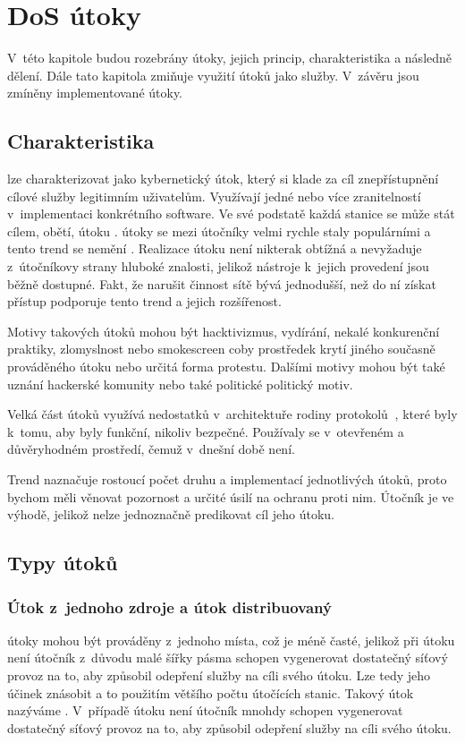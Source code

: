 \chapter[DoS útoky]{DoS útoky}
V~této kapitole budou rozebrány  útoky, jejich princip, charakteristika a následně
dělení. Dále tato kapitola zmiňuje využití  útoků jako služby. V~závěru jsou
zmíněny implementované útoky.

\section{Charakteristika}
 lze charakterizovat jako kybernetický útok, který si klade za cíl znepřístupnění
 cílové služby legitimním uživatelům. Využívají jedné nebo více zranitelností v~implementaci
 konkrétního software. Ve své podstatě každá stanice se může stát cílem, obětí, útoku
 .  útoky se mezi útočníky velmi rychle staly populárními a tento trend
 se nemění \cite{akamai_q2_2017}. Realizace  útoku není nikterak obtížná a
 nevyžaduje z~útočníkovy strany hluboké znalosti, jelikož nástroje k~jejich provedení jsou
 běžně dostupné. %
 Fakt, že narušit činnost sítě bývá
 jednodušší, než do ní získat přístup podporuje tento trend a jejich rozšířenost. 

Motivy takových útoků mohou být hacktivizmus, vydírání, nekalé konkurenční praktiky,
zlomyslnost nebo smokescreen coby prostředek krytí jiného současně prováděného útoku nebo
určitá forma protestu. Dalšími motivy mohou být také uznání hackerské komunity nebo také
politické politický motiv.

Velká část útoků využívá nedostatků v~architektuře rodiny protokolů $ \ $,
které byly k~tomu, aby byly funkční, nikoliv bezpečné. Používaly se v~otevřeném a
důvěryhodném prostředí, čemuž v~dnešní době není.

Trend naznačuje rostoucí počet druhu a implementací jednotlivých útoků, proto bychom měli
věnovat pozornost a určité úsilí na ochranu proti nim. Útočník je ve výhodě, jelikož nelze
jednoznačně predikovat cíl jeho útoku.


\section{Typy útoků}
\subsection{Útok z~jednoho zdroje a útok distribuovaný}
\label{subs_ddos}
 útoky mohou být prováděny z~jednoho místa, což je méně časté, jelikož při
 útoku není útočník z~důvodu malé šířky pásma schopen vygenerovat dostatečný síťový
provoz na to, aby způsobil odepření služby na cíli svého útoku. Lze tedy jeho účinek znásobit
a to použitím většího počtu útočících stanic. Takový útok nazýváme .
V~případě  útoku není útočník mnohdy schopen vygenerovat dostatečný síťový provoz
na to, aby způsobil odepření služby na cíli svého útoku.

